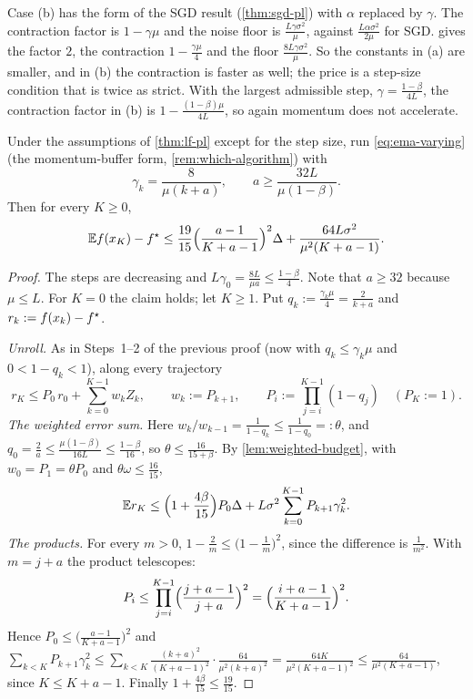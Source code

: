 Case (b) has the form of the SGD result (\cref{thm:sgd-pl}) with $\alpha$ replaced by
$\gamma$. The contraction factor is $1-\gamma\mu$ and the noise floor is
$\frac{L\gamma\sigma^2}{\mu}$, against $\frac{L\alpha\sigma^2}{2\mu}$ for SGD.  gives
the factor $2$, the contraction $1-\frac{\gamma\mu}{4}$ and the floor $\frac{8L\gamma\sigma^2}{\mu}$.
So the constants in (a) are smaller, and in (b) the contraction is faster as well; the price
is a step-size condition that is twice as strict. With the largest admissible step,
$\gamma=\frac{1-\beta}{4L}$, the contraction factor in (b) is $1-\frac{(1-\beta)\mu}{4L}$, so
again momentum does not accelerate.

\begin{corollary}\label{cor:lf-pl-decay}
Under the assumptions of \cref{thm:lf-pl} except for the step size, run
\eqref{eq:ema-varying} (the momentum-buffer form, \cref{rem:which-algorithm}) with
\[
  \gamma_k=\frac{8}{\mu(k+a)},\qquad a\ge\frac{32L}{\mu(1-\beta)} .
\]
Then for every $K\ge0$,
\[
  \mathbb{E} f(x_K)-f^\star\le\frac{19}{15}\Bigl(\frac{a-1}{K+a-1}\Bigr)^2\Delta+\frac{64L\sigma^2}{\mu^2(K+a-1)} .
\]
\end{corollary}

\begin{proof}
The steps are decreasing and $L\gamma_0=\frac{8L}{\mu a}\le\frac{1-\beta}{4}$. Note that
$a\ge32$ because $\mu\le L$. For $K=0$ the claim holds; let $K\ge1$. Put
$q_k:=\frac{\gamma_k\mu}{4}=\frac{2}{k+a}$ and $r_k:=f(x_k)-f^\star$.

\emph{Unroll.} As in Steps~1--2 of the previous proof (now with $q_k\le\gamma_k\mu$ and
$0<1-q_k<1$), along every trajectory
\[
  r_K\le P_0\,r_0+\sum_{k=0}^{K-1}w_kZ_k,\qquad w_k:=P_{k+1},\qquad
  P_i:=\prod_{j=i}^{K-1}(1-q_j)\quad(P_K:=1).
\]
\emph{The weighted error sum.} Here $w_k/w_{k-1}=\frac{1}{1-q_k}\le\frac1{1-q_0}=:\theta$, and
$q_0=\frac2a\le\frac{\mu(1-\beta)}{16L}\le\frac{1-\beta}{16}$, so $\theta\le\frac{16}{15+\beta}$.
By \cref{lem:weighted-budget}, with $w_0=P_1=\theta P_0$ and $\theta\omega\le\frac{16}{15}$,
\[
  \mathbb{E} r_K\le\Bigl(1+\frac{4\beta}{15}\Bigr)P_0\Delta+L\sigma^2\sum_{k=0}^{K-1}P_{k+1}\gamma_k^2 .
\]
\emph{The products.} For every $m>0$, $1-\frac2m\le\bigl(1-\frac1m\bigr)^2$, since the
difference is $\frac1{m^2}$. With $m=j+a$ the product telescopes:
\[
  P_i\le\prod_{j=i}^{K-1}\Bigl(\frac{j+a-1}{j+a}\Bigr)^2=\Bigl(\frac{i+a-1}{K+a-1}\Bigr)^2 .
\]
Hence $P_0\le\bigl(\frac{a-1}{K+a-1}\bigr)^2$ and
$\sum_{k<K}P_{k+1}\gamma_k^2\le\sum_{k<K}\frac{(k+a)^2}{(K+a-1)^2}\cdot\frac{64}{\mu^2(k+a)^2}
=\frac{64K}{\mu^2(K+a-1)^2}\le\frac{64}{\mu^2(K+a-1)}$, since $K\le K+a-1$. Finally
$1+\frac{4\beta}{15}\le\frac{19}{15}$.
\end{proof}

